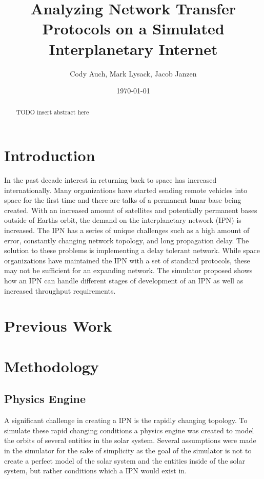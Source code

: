 \documentclass[a4paper,12pt]{article}
\title{Analyzing Network Transfer Protocols on a Simulated Interplanetary Internet}
\author{Cody Auch, Mark Lysack, Jacob Janzen}
\date{\today}
\begin{document}
\maketitle

\begin{abstract}
    TODO insert abstract here
\end{abstract}

\section{Introduction}

In the past decade interest in returning back to space has increased internationally. Many organizations 
have started sending remote vehicles into space for the first time \cite{(indian space program, spaceX, ect)}
and there are talks of a permanent lunar base being created. With an increased amount of satellites and potentially 
permanent bases outside of Earths orbit, the demand on the interplanetary network (IPN) is increased. The IPN has a 
series of unique challenges such as a high amount of error, constantly changing network topology, and long 
propagation delay. The solution to these problems is implementing a delay tolerant network. While space organizations 
have maintained the IPN with a set of standard protocols, these may not be sufficient for an expanding network.
The simulator proposed shows how an IPN can handle different stages of development of an IPN as well as increased 
throughput requirements.

\section{Previous Work}

\section{Methodology}

\subsection{Physics Engine}

A significant challenge in creating a IPN is the rapidly changing topology. To simulate 
these rapid changing conditions a physics engine was created to model the orbits of several 
entities in the solar system. Several assumptions were made in the simulator for the sake of 
simplicity as the goal of the simulator is not to create a perfect model of the solar system 
and the entities inside of the solar system, but rather conditions which a IPN would exist in. 
\end{document}
